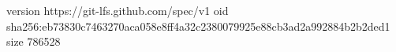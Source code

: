 version https://git-lfs.github.com/spec/v1
oid sha256:eb73830c7463270aca058e8ff4a32c2380079925e88cb3ad2a992884b2b2ded1
size 786528
